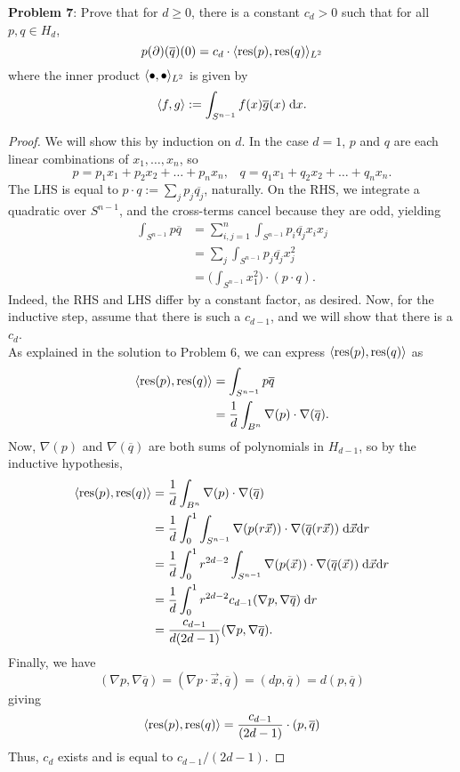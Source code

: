 \documentclass{amsart}
\DeclareMathOperator{\res}{res}
\begin{document}
	\newpage 
	\noindent \textbf{Problem 7}: Prove that for $d\geq 0$, there is a constant $c_d>0$ such that for all $p,q\in H_d$, 
	$$p(\partial)(\overline{q})(0) = c_d \cdot \<\res(p),\res(q)\>_{L^2}$$
	where the inner product $\langle\bullet,\bullet\rangle_{L^2}$ is given by 
	$$
	\langle f,g\rangle := \int_{S^{n-1}} f(x)\overline{g}(x)
 \; \textrm{d} x.$$
 
 \begin{proof}
 	We will show this by induction on $d$. In the case $d=1$, $p$ and $q$ are each linear combinations of $x_1,\dots,x_n$, so 
 	$$
 	p = p_1x_1 + p_2x_2+\dots +p_n x_n, \;\;\; 	q = q_1x_1 + q_2x_2+\dots +q_n x_n.
 	$$
 	The LHS is equal to $p\cdot q:= \sum_j p_j\overline{q_j}$, naturally. On the RHS, we integrate a quadratic over $S^{n-1}$, and the cross-terms cancel because they are odd, yielding
 	\begin{align*}
 		\int_{S^{n-1}} p\overline{q} &= \sum_{i,j=1}^n \int_{S^{n-1}} p_i\overline{q_j} x_ix_j\\
 		&= \sum_j \int_{S^{n-1}} p_j\overline{q_j} x_j^2\\
 		&= \bigg(\int_{S^{n-1}} x_1^2 \bigg) \cdot (p \cdot q).
 	\end{align*}
 	Indeed, the RHS and LHS differ by a constant factor, as desired. Now, for the inductive step, assume that there is such a $c_{d-1}$, and we will show that there is a $c_d$.\\
 	
 	As explained in the solution to Problem 6, we can express $\<\res(p),\res(q)\>$ as 
 	\begin{align*}
 		\<\res(p),\res(q)\> &= \int_{S^{n-1}} p\overline{q} \\
 		&= \frac{1}{d}\int_{B^n} \nabla(p) \cdot \nabla(\overline{q}).
 	\end{align*}
 	Now, $\nabla(p)$ and $\nabla(\overline{q})$ are both sums of polynomials in $H_{d-1}$, so by the inductive hypothesis,
 	\begin{align*}
 		\<\res(p),\res(q)\> &= \frac{1}{d}\int_{B^n} \nabla(p) \cdot \nabla(\overline{q})\\
 		&= \frac{1}{d} \int_{0}^1 \int_{S^{n-1}} \nabla(p(r\vec{x})) \cdot \nabla(\overline{q}(r\vec{x})) \;\d \vec{x} \d r\\
 		&= \frac{1}{d} \int_{0}^1 r^{2d-2} \int_{S^{n-1}} \nabla(p(\vec{x})) \cdot \nabla(\overline{q}(\vec{x})) \;\d \vec{x} \d r\\
 		&= \frac{1}{d} \int_{0}^1 r^{2d-2} c_{d-1} (\nabla p,\nabla\overline{q})\;\d r\\
 		&= \frac{c_{d-1}}{d(2d-1)} (\nabla p, \nabla \overline{q}).
 	\end{align*}
 	Finally, we have
 	$$
 	(\nabla p,\nabla \overline{q}) = (\nabla p \cdot \vec{x},\overline{q}) = (dp,\overline{q}) = d(p,\overline{q})
 	$$
 	giving 
 	$$
 	\<\res(p),\res(q)\> = \frac{c_{d-1}}{(2d-1)} \cdot (p,\overline{q})
 	$$
 	Thus, $c_d$ exists and is equal to $c_{d-1}/(2d-1)$.
 \end{proof}
 
\end{document}
